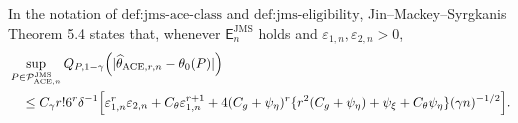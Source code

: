In the notation of \(\text{def:jms-ace-class}\) and
\(\text{def:jms-eligibility}\), Jin--Mackey--Syrgkanis Theorem 5.4
states that, whenever \(\mathsf E_n^{\mathrm{JMS}}\) holds and
\(\varepsilon_{1,n},\varepsilon_{2,n}>0\),
\[
\begin{split}
 &\sup_{P\in\mathcal P_{\mathrm{ACE},n}^{\mathrm{JMS}}}
 Q_{P,1-\gamma}
 \!\left(|\widehat\theta_{\mathrm{ACE},r,n}-\theta_0(P)|\right)\\
 &\quad\le C_\gamma r!6^r\delta^{-1}
 \Bigl[\varepsilon_{1,n}^r\varepsilon_{2,n}
 +C_\theta\varepsilon_{1,n}^{r+1}
 +4(C_g+\psi_\eta)^r
 \{r^2(C_g+\psi_\eta)+\psi_\xi+C_\theta\psi_\eta\}
 (\gamma n)^{-1/2}\Bigr].
\end{split}
\]